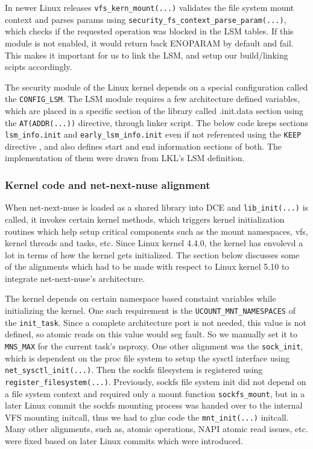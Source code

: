 \documentclass{sig-alternate}
\begin{document}
In newer Linux releases \texttt{vfs\_kern\_mount(...)} validates the file system mount context and parses params using \texttt{security\_fs\_context\_parse\_param(...)},
which checks if the requested operation was blocked in the LSM tables. If this module is not enabled, it would return back ENOPARAM by default and fail. This makes it 
important for us to link the LSM, and setup our build/linking scipts accordingly.

The security module of the Linux kernel depends on a special configuration called the \texttt{CONFIG\_LSM}. The LSM module requires a few architecture
defined variables, which are placed in a specific section
of the library called .init.data section using the \texttt{AT(ADDR(...))} directive, through linker script. 
The below code keeps sections \texttt{lsm\_info.init} and \texttt{early\_lsm\_info.init} even if not referenced using the \texttt{KEEP} directive , 
and also defines start and end information sections of both.  The implementation of them were drawn from LKL's LSM definition.

\subsubsection{Kernel code and net-next-nuse alignment}
When net-next-nuse is loaded as a shared library into DCE and \texttt{lib\_init(...)} is called, it invokes certain kernel methods, which triggers 
kernel initialization routines which help setup critical components such as the mount namespaces, vfs, kernel threads and tasks, etc. 
Since Linux kernel 4.4.0, the
kernel has envolevd a lot in terms of how the kernel gets initialized. The section below discusses some of the alignments which had to be made with respect to 
Linux kernel 5.10 to integrate net-next-nuse's architecture.

The kernel depends on certain namespace based constaint variables while initializing the kernel. One such requirement is the \texttt{UCOUNT\_MNT\_NAMESPACES}
of the \texttt{init\_task}. Since a complete architecture port is not needed, this value is not defined, so atomic reads on this value would seg fault. So 
we manually set it to \texttt{MNS\_MAX} for the current task's nsproxy. One other alignment was the \texttt{sock\_init}, which is dependent on the proc file system  
to setup the sysctl interface using \texttt{net\_sysctl\_init(...)}. Then the sockfs filesystem is registered using \texttt{register\_filesystem(...)}. Previously,
sockfs file system init did not depend on a file system context and required only a mount function \texttt{sockfs\_mount}, but in a later Linux commit the sockfs 
mounting process was handed over to the internal VFS mounting initcall, thus we had to glue code the \texttt{mnt\_init(...)} initcall. Many other alignments, such as,
atomic operations, NAPI atomic read issues, etc. were fixed based on later Linux commits which were introduced.
\end{document}
